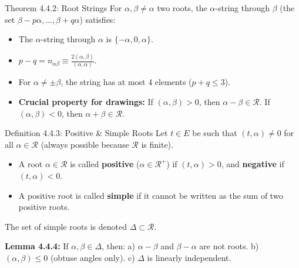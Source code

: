 \begin{frame}[label=backup_astring]{Theorem 4.4.2: Root Strings}
    For $\alpha, \beta \ne \alpha$ two roots, the $\alpha$-string through $\beta$ (the set $\beta - p\alpha, \dots, \beta + q\alpha$) satisfies:
    \begin{itemize}
        \item[a)] The $\alpha$-string through $\alpha$ is $\{-\alpha, 0, \alpha\}$.
        \item[b)] $p - q = n_{\alpha\beta} \equiv \frac{2(\alpha, \beta)}{(\alpha, \alpha)}$.
        \item[c)] For $\alpha \ne \pm \beta$, the string has at most 4 elements ($p+q \le 3$).
        \item[d)] \textbf{Crucial property for drawings:} If $(\alpha, \beta) > 0$, then $\alpha - \beta \in \mathcal{R}$. If $(\alpha, \beta) < 0$, then $\alpha + \beta \in \mathcal{R}$.
    \end{itemize}
\end{frame}

\begin{frame}[label=backup_simpleroots]{Definition 4.4.3: Positive \& Simple Roots}
    Let $t \in E$ be such that $(t, \alpha) \ne 0$ for all $\alpha \in \mathcal{R}$ (always possible because $\mathcal{R}$ is finite).

    \begin{itemize}
        \item A root $\alpha \in \mathcal{R}$ is called \textbf{positive} ($\alpha \in \mathcal{R}^+$) if $(t, \alpha) > 0$, and \textbf{negative} if $(t, \alpha) < 0$.
        \item A positive root is called \textbf{simple} if it cannot be written as the sum of two positive roots.
    \end{itemize}

    The set of simple roots is denoted $\Delta \subset \mathcal{R}$.

    \vspace{0.2cm}
    \textbf{Lemma 4.4.4:} If $\alpha, \beta \in \Delta$, then:
    a) $\alpha - \beta$ and $\beta - \alpha$ are not roots.
    b) $(\alpha, \beta) \le 0$ (obtuse angles only).
    c) $\Delta$ is linearly independent.
\end{frame}